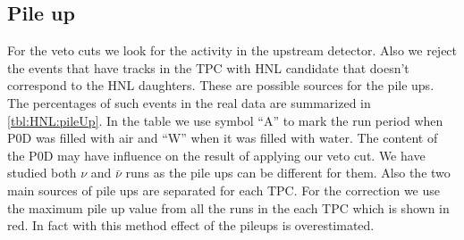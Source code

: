 \documentclass[../main.tex]{subfiles}
\begin{document}
\subsection{Pile up}
\label{sec:HNL:pileup}
For the veto cuts we look for the activity in the upstream detector. Also we reject the events that have tracks in the TPC with HNL candidate that doesn't correspond to the HNL daughters. These are possible sources for the pile ups. The percentages of such events in the real data are summarized in \autoref{tbl:HNL:pileUp}. In the table we use symbol ``A'' to mark the run period when P0D was filled with air and ``W'' when it was filled with water. The content of the P0D may have influence on the result of applying our veto cut. We have studied both $\nu$ and $\bar{\nu}$ runs as the pile ups can be different for them. Also the two main sources of pile ups are separated for each TPC. For the correction we use the maximum pile up value from all the runs in the each TPC which is shown in red. In fact with this method effect of the pileups is overestimated.
\end{document}
